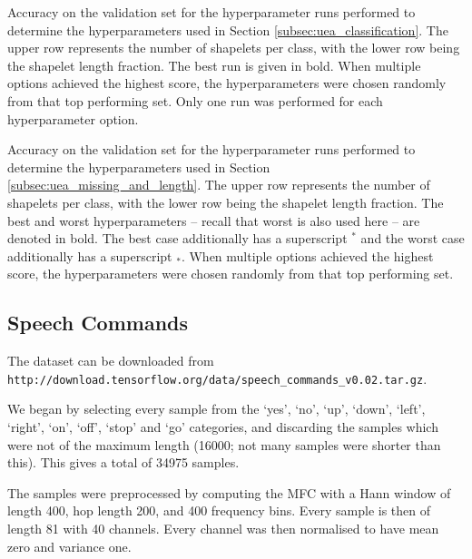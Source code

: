 \documentclass{article}
\theoremstyle{plain}
\theoremstyle{definition}
\begin{document}
	\begin{table}
		\centering
		
		\caption{Accuracy on the validation set for the hyperparameter runs performed to determine the hyperparameters used in Section \ref{subsec:uea_classification}. The upper row represents the number of shapelets per class, with the lower row being the shapelet length fraction. The best run is given in bold. When multiple options achieved the highest score, the hyperparameters were chosen randomly from that top performing set. Only one run was performed for each hyperparameter option.}\label{tab:uea_hyperparams_old_results}

		\bigskip\bigskip  %

		\centering
		
		\caption{Accuracy on the validation set for the hyperparameter runs performed to determine the hyperparameters used in Section \ref{subsec:uea_missing_and_length}. The upper row represents the number of shapelets per class, with the lower row being the shapelet length fraction. The best and worst hyperparameters -- recall that worst is also used here -- are denoted in bold. The best case additionally has a superscript $^*$ and the worst case additionally has a superscript $_*$. When multiple options achieved the highest score, the hyperparameters were chosen randomly from that top performing set.}\label{tab:uea_hyperparams_l2_results}
	\end{table}


	\subsection{Speech Commands}\label{apx:further_speech_commands_interpretability}
	The dataset can be downloaded from\\ \texttt{http://download.tensorflow.org/data/speech\_commands\_v0.02.tar.gz}.
	
	We began by selecting every sample from the `yes', `no', `up', `down', `left', `right', `on', `off', `stop' and `go' categories, and discarding the samples which were not of the maximum length (16000; not many samples were shorter than this). This gives a total of 34975 samples.
	
	The samples were preprocessed by computing the MFC with a Hann window of length 400, hop length 200, and 400 frequency bins. Every sample is then of length 81 with 40 channels. Every channel was then normalised to have mean zero and variance one.
	
\end{document}
